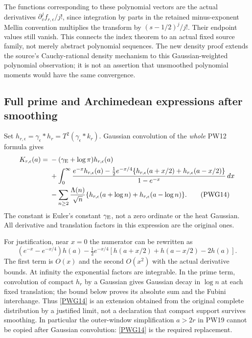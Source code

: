 \documentclass[11pt,a4paper]{article}
\theoremstyle{definition}\newtheorem{definition}[theorem]{Definition}
\begin{document}
The functions corresponding to these polynomial vectors are the actual derivatives $\partial_v^j f_{r,\epsilon}/j!$, since integration by parts in the retained minus-exponent Mellin convention multiplies the transform by $(s-1/2)^j/j!$. Their endpoint values still vanish. This connects the index theorem to an actual fixed source family, not merely abstract polynomial sequences. The new density proof extends the source's Cauchy-rational density mechanism to this Gaussian-weighted polynomial observation; it is not an assertion that unsmoothed polynomial moments would have the same convergence.

\subsection{Full prime and Archimedean expressions after smoothing}
Set $h_{r,\epsilon}=\gamma_\epsilon*h_r=T^2(\gamma_\epsilon*k_r)$. Gaussian convolution of the \emph{whole} PW12 formula gives
\begin{align}
 K_{r,\epsilon}(a)={}&-(\gamma_{\rm E}+\log\pi)h_{r,\epsilon}(a)\notag\\
 &+\int_0^\infty\frac{e^{-x}h_{r,\epsilon}(a)
   -\tfrac12e^{-x/4}\{h_{r,\epsilon}(a+x/2)+h_{r,\epsilon}(a-x/2)\}}
                       {1-e^{-x}}\,dx\notag\\
 &-\sum_{n\ge2}\frac{\Lambda(n)}{\sqrt n}
       \{h_{r,\epsilon}(a+\log n)+h_{r,\epsilon}(a-\log n)\}.
                                                               \tag{PWG14}\label{PWG14}
\end{align}
The constant is Euler's constant $\gamma_{\rm E}$, not a zero ordinate or the heat Gaussian. All derivative and translation factors in this expression are the original ones.

For justification, near $x=0$ the numerator can be rewritten as
\[
 (e^{-x}-e^{-x/4})h(a)
 -\tfrac12e^{-x/4}[h(a+x/2)+h(a-x/2)-2h(a)].
\]
The first term is $O(x)$ and the second $O(x^2)$ with the actual derivative bounds. At infinity the exponential factors are integrable. In the prime term, convolution of compact $h_r$ by a Gaussian gives Gaussian decay in $\log n$ at each fixed translation; the bound below proves its absolute sum and the Fubini interchange. Thus \eqref{PWG14} is an extension obtained from the original complete distribution by a justified limit, not a declaration that compact support survives smoothing. In particular the outer-window simplification $a>2r$ in PW19 cannot be copied after Gaussian convolution: \eqref{PWG14} is the required replacement.
\end{document}
